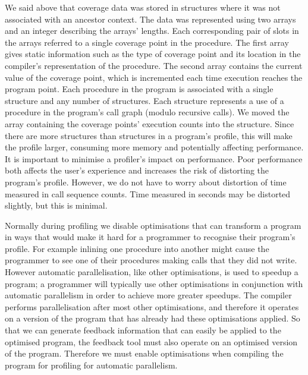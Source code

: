 We said above that coverage data was stored in \PS structures where it was
not associated with an ancestor context.
The data was represented using two arrays and an integer describing the
arrays' lengths.
Each corresponding pair of slots in the arrays referred to a single coverage
point in the procedure.
The first array gives static information such as the type of coverage point and
its location in the compiler's representation of the procedure.
The second array contains the current value of the coverage point,
which is incremented each time execution reaches the program point.
Each procedure in the program is associated with a single \PS structure
and any number of \PD structures.
Each \PD structure represents a use of a procedure in the program's
call graph (modulo recursive calls).
We moved the array containing the coverage points' execution
counts into the \PD structure.
Since there are more \PD structures than \PS structures in a program's
profile,
this will make the profile larger, consuming more memory and potentially
affecting performance.
It is important to minimise a profiler's impact on performance.
Poor performance both affects the user's experience and
increases the risk of distorting the program's profile.
However, we do not have to worry about distortion of time measured in
call sequence counts.
Time measured in seconds may be distorted slightly, but this is minimal.

Normally during profiling we disable optimisations that can transform a
program in ways that would make it hard for a programmer to recognise their
program's profile.
For example inlining one procedure into another might cause the programmer
to see one of their procedures making calls that they
did not write.
However automatic parallelisation, like other optimisations,
is used to speedup a program;
a programmer will typically use other optimisations in conjunction with
automatic parallelism in order to achieve more greater speedups.
The compiler performs parallelisation after most other optimisations,
and therefore it operates on a version of the program that has already had
these optimisations applied.
So that we can generate feedback information that can easily be applied to
the optimised program,
the feedback tool must also operate on an optimised version of the program.
Therefore we must enable optimisations when compiling the program for
profiling for automatic parallelism.

